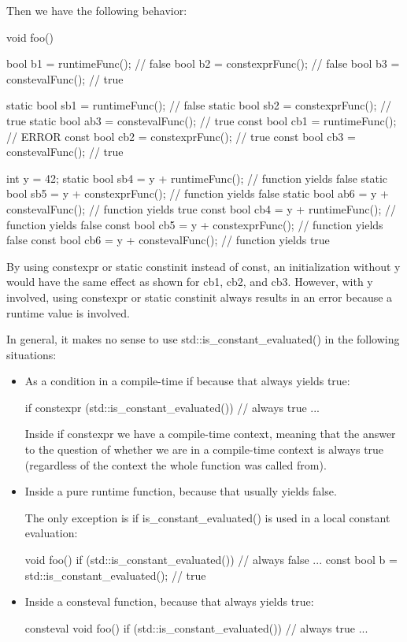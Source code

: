 Then we have the following behavior:

\begin{cpp}
void foo()
{
	bool b1 = runtimeFunc(); // false
	bool b2 = constexprFunc(); // false
	bool b3 = constevalFunc(); // true
	
	static bool sb1 = runtimeFunc(); // false
	static bool sb2 = constexprFunc(); // true
	static bool ab3 = constevalFunc(); // true
	const bool cb1 = runtimeFunc(); // ERROR
	const bool cb2 = constexprFunc(); // true
	const bool cb3 = constevalFunc(); // true
	
	int y = 42;
	static bool sb4 = y + runtimeFunc(); // function yields false
	static bool sb5 = y + constexprFunc(); // function yields false
	static bool ab6 = y + constevalFunc(); // function yields true
	const bool cb4 = y + runtimeFunc(); // function yields false
	const bool cb5 = y + constexprFunc(); // function yields false
	const bool cb6 = y + constevalFunc(); // function yields true
}
\end{cpp}

By using constexpr or static constinit instead of const, an initialization without y would have the same effect as shown for cb1, cb2, and cb3. However, with y involved, using constexpr or static constinit always results in an error because a runtime value is involved.

In general, it makes no sense to use std::is\_constant\_evaluated() in the following situations:

\begin{itemize}
\item 
As a condition in a compile-time if because that always yields true:

\begin{cpp}
if constexpr (std::is_constant_evaluated()) { // always true
	...
}
\end{cpp}

Inside if constexpr we have a compile-time context, meaning that the answer to the question of whether we are in a compile-time context is always true (regardless of the context the whole function was called from).

\item 
Inside a pure runtime function, because that usually yields false.

The only exception is if is\_constant\_evaluated() is used in a local constant evaluation:

\begin{cpp}
void foo() {
	if (std::is_constant_evaluated()) { // always false
		...
	}
	const bool b = std::is_constant_evaluated(); // true
}
\end{cpp}

\item 
Inside a consteval function, because that always yields true:

\begin{cpp}
consteval void foo() {
	if (std::is_constant_evaluated()) { // always true
		...
	}
}
\end{cpp}

\end{itemize}

